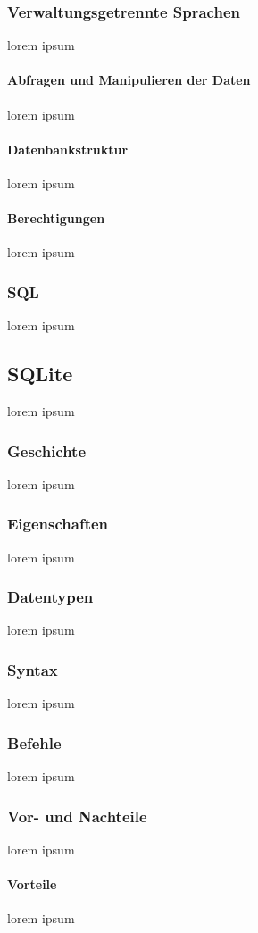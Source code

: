 \documentclass[10pt,a4paper]{report}
\begin{document}
\subsubsection{Verwaltungsgetrennte Sprachen}
lorem ipsum
\paragraph{Abfragen und Manipulieren der Daten}
lorem ipsum
\paragraph{Datenbankstruktur}
lorem ipsum
\paragraph{Berechtigungen}
lorem ipsum
\subsubsection{SQL}
lorem ipsum
\subsection{SQLite}
lorem ipsum
\subsubsection{Geschichte}
lorem ipsum
\subsubsection{Eigenschaften}
lorem ipsum
\subsubsection{Datentypen}
lorem ipsum
\subsubsection{Syntax}
lorem ipsum 
\subsubsection{Befehle}
lorem ipsum
\subsubsection{Vor- und Nachteile}
lorem ipsum
\paragraph{Vorteile}
lorem ipsum
\end{document}
